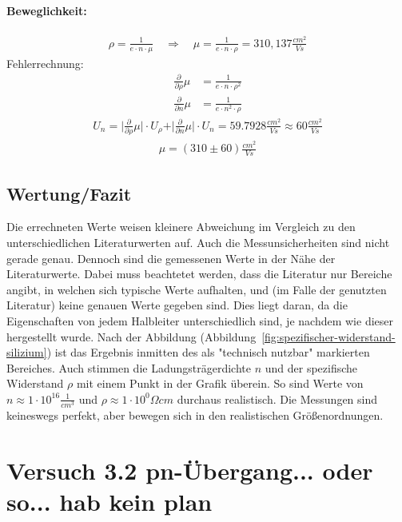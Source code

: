 \documentclass[a4paper]{scrartcl}
\numberwithin{equation}{subsection}
\begin{document}
\paragraph{Beweglichkeit:\\}
\begin{align}
\rho = \frac{1}{e \cdot n \cdot \mu} \quad \Rightarrow \quad \mu = \frac{1}{e \cdot n \cdot \rho} = 310,137 \frac{cm^2}{Vs}
\end{align}
Fehlerrechnung:
\begin{align*}
\frac{\partial}{\partial \rho} \mu &= \frac{1}{e \cdot n \cdot \rho^2} \\
\frac{\partial}{\partial n} \mu &= \frac{1}{e \cdot n^2 \cdot \rho} 
\end{align*}
\begin{align*}
U_{n} = \vert \frac{\partial}{\partial \rho} \mu \vert \cdot U_{\rho} + 
		\vert \frac{\partial}{\partial n} \mu \vert \cdot U_{n} = 59.7928 \frac{cm^2}{Vs} \approx 60 \frac{cm^2}{Vs}
\end{align*}
\begin{align*}
\mu = (310 \pm 60)\frac{cm^2}{Vs}
\end{align*}

\newpage

\subsection{Wertung/Fazit}
Die errechneten Werte weisen kleinere Abweichung im Vergleich zu den unterschiedlichen Literaturwerten auf. Auch die Messunsicherheiten sind nicht gerade genau. Dennoch sind die gemessenen Werte in der Nähe der Literaturwerte. Dabei muss beachtetet werden, dass die Literatur nur Bereiche angibt, in welchen sich typische Werte aufhalten, und (im Falle der genutzten Literatur) keine genauen Werte gegeben sind. Dies liegt daran, da die Eigenschaften von jedem Halbleiter unterschiedlich sind, je nachdem wie dieser hergestellt wurde.
Nach der Abbildung (Abbildung~\ref{fig:spezifischer-widerstand-silizium}) ist das Ergebnis inmitten des als "technisch nutzbar" markierten Bereiches. Auch stimmen die Ladungsträgerdichte $n$ und der spezifische Widerstand $\rho$ mit einem Punkt in der Grafik überein. So sind Werte von $n \approx 1 \cdot 10^{16} \frac{1}{cm^3}$ und $\rho \approx 1 \cdot 10^0 \Omega cm$ durchaus realistisch.
Die Messungen sind keineswegs perfekt, aber bewegen sich in den realistischen Größenordnungen.

\newpage


\section{Versuch 3.2 pn-Übergang... oder so... hab kein plan}
\end{document}
